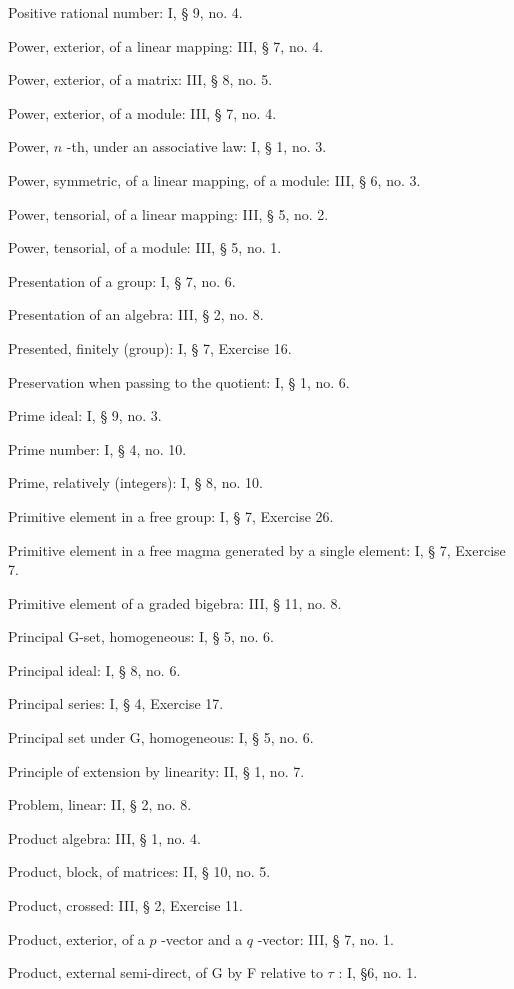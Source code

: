 Positive rational number: I, § 9, no. 4.

Power, exterior, of a linear mapping: III, § 7, no. 4.

Power, exterior, of a matrix: III, § 8, no. 5.

Power, exterior, of a module: III, § 7, no. 4.

Power, \(n\) -th, under an associative law: I, § 1, no. 3.

Power, symmetric, of a linear mapping, of a module: III, § 6, no. 3.

Power, tensorial, of a linear mapping: III, § 5, no. 2.

Power, tensorial, of a module: III, § 5, no. 1.

Presentation of a group: I, § 7, no. 6.

Presentation of an algebra: III, § 2, no. 8.

Presented, finitely (group): I, § 7, Exercise 16.

Preservation when passing to the quotient: I, § 1, no. 6.

Prime ideal: I, § 9, no. 3.

Prime number: I, § 4, no. 10.

Prime, relatively (integers): I, § 8, no. 10.

Primitive element in a free group: I, § 7, Exercise 26.

Primitive element in a free magma generated by a single element: I, § 7, Exercise 7.

Primitive element of a graded bigebra: III, § 11, no. 8.

Principal G-set, homogeneous: I, § 5, no. 6.

Principal ideal: I, § 8, no. 6.

Principal series: I, § 4, Exercise 17.

Principal set under G, homogeneous: I, § 5, no. 6.

Principle of extension by linearity: II, § 1, no. 7.

Problem, linear: II, § 2, no. 8.

Product algebra: III, § 1, no. 4.

Product, block, of matrices: II, § 10, no. 5.

Product, crossed: III, § 2, Exercise 11.

Product, exterior, of a \(p\) -vector and a \(q\) -vector: III, § 7, no. 1.

Product, external semi-direct, of G by F relative to \(\tau\) : I, §6, no. 1.

